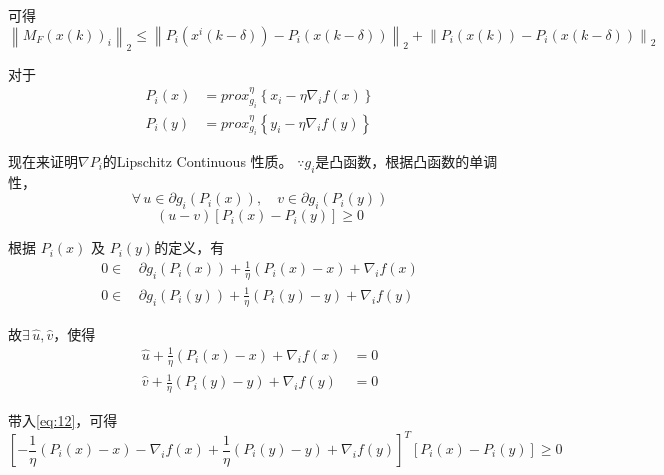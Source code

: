 \documentclass{ctexart}
\begin{document}
可得
\begin{equation}\label{eq:9}
  \left\| M_F \left(x\left(k\right)\right)_i \right\|_2 \leq \left\| P_i \left(x^i \left(k-\delta\right)\right) - P_i \left(x\left(k-\delta\right)\right) \right\|_2 + \left\| P_i \left(x\left(k\right)\right) -  P_i \left(x\left(k-\delta\right)\right)\right\|_2
\end{equation}

对于
\begin{align}\label{eq:10}
  P_i \left(x\right) & = prox_{g_i}^\eta \left\{ x_i - \eta \nabla_i f\left(x\right) \right\} \\
  P_i \left(y\right) & = prox_{g_i}^\eta \left\{ y_i - \eta \nabla_i f\left(y\right) \right\}
\end{align}

现在来证明$\nabla P_i$的Lipschitz Continuous 性质。
$\because g_i$是凸函数，根据凸函数的单调性，
\begin{equation}\label{eq:11}
  \forall \, u\in \partial g_i \left(P_i \left(x\right)\right),\quad v\in \partial g_i \left(P_i \left(y\right)\right)
\end{equation}
\begin{equation}\label{eq:12}
  \left( u-v \right)\left[ P_i \left(x\right) - P_i \left(y\right) \right] \geq 0
\end{equation}

根据 $P_i \left(x\right)$ 及 $ P_i \left(y\right)$的定义，有
\begin{align}\label{eq:a1}
  0 \in \, & \partial g_i \left(P_i \left(x\right)\right) + \frac{1}{\eta}\left(P_i \left(x\right)-x \right) +\nabla_i f\left(x\right) \\
  0 \in \, & \partial g_i \left(P_i \left(y\right)\right) + \frac{1}{\eta}\left(P_i \left(y\right)-y \right) +\nabla_i f\left(y\right)
\end{align}

故$\exists \, \hat{u}, \hat{v}$，使得
\begin{align}\label{eq:a2}
  \hat{u}+\frac{1}{\eta}\left(P_i \left(x\right) - x\right) +\nabla_i f\left(x\right) & = 0 \\
  \hat{v}+\frac{1}{\eta}\left(P_i \left(y\right) - y\right) +\nabla_i f\left(y\right) & = 0
\end{align}

带入\ref{eq:12}，可得
\begin{equation}\label{eq:an}
  \left[ -\frac{1}{\eta}\left( P_i \left(x\right) - x \right) - \nabla_i f\left(x\right) + \frac{1}{\eta} \left( P_i \left(y\right) - y \right) + \nabla_i f\left(y\right)\right]^{T}\left[ P_i \left(x\right) - P_i \left(y\right) \right] \geq 0
\end{equation}
\end{document}
